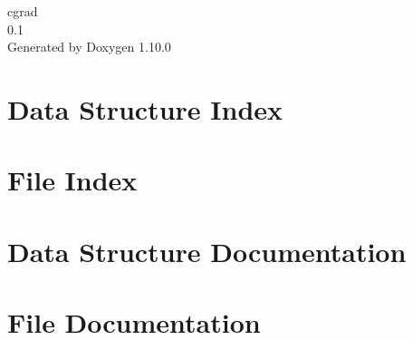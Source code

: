 \documentclass[twoside]{book}
\newcommand{\+}{\discretionary{\mbox{\scriptsize$\hookleftarrow$}}{}{}}
\newcommand{\clearemptydoublepage}{%
    \newpage{\pagestyle{empty}\cleardoublepage}%
  }
\begin{document}
  \raggedbottom
    \hypersetup{pageanchor=false,
                bookmarksnumbered=true,
                pdfencoding=unicode
               }
  \begin{titlepage}
  \vspace*{7cm}
  \begin{center}%
  {\Large cgrad}\\
  [1ex]\large 0.\+1 \\
  \vspace*{1cm}
  {\large Generated by Doxygen 1.10.0}\\
  \end{center}
  \end{titlepage}
  \clearemptydoublepage
  \tableofcontents
  \clearemptydoublepage
  \hypersetup{pageanchor=true}

\chapter{Data Structure Index}

\chapter{File Index}

\chapter{Data Structure Documentation}

\chapter{File Documentation}










  \backmatter
  \newpage
  \clearemptydoublepage
  \printindex
\end{document}
